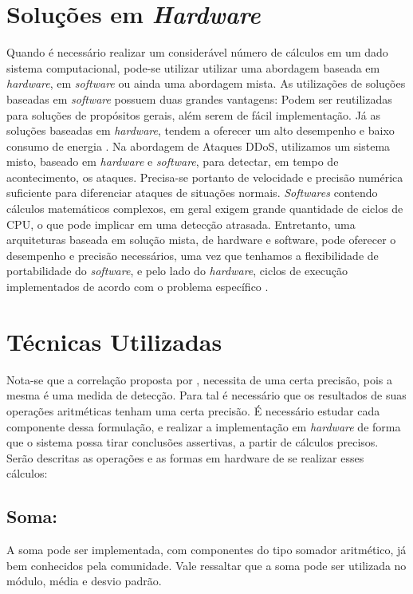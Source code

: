 \section{Soluções em \textit{Hardware}}

Quando é necessário realizar um considerável número de cálculos em um dado sistema computacional, pode-se utilizar utilizar uma abordagem baseada em \textit{hardware}, em \textit{software} ou ainda uma abordagem mista. As utilizações de soluções baseadas em \textit{software} possuem duas grandes vantagens: Podem ser reutilizadas para soluções de propósitos gerais, além serem de fácil implementação. Já as soluções baseadas em \textit{hardware}, tendem a oferecer um alto desempenho e baixo consumo de energia \cite{HOQUE201748}.  Na abordagem de Ataques DDoS, utilizamos um sistema misto, baseado em \textit{hardware} e \textit{software}, para detectar, em tempo de acontecimento, os ataques. Precisa-se portanto de velocidade e precisão numérica suficiente para diferenciar ataques de situações normais. \textit{Softwares} contendo cálculos matemáticos complexos, em geral exigem grande quantidade de ciclos de CPU, o que pode implicar em uma detecção atrasada. Entretanto, uma arquiteturas baseada em solução mista, de hardware e software, pode oferecer o desempenho e precisão necessários, uma vez que tenhamos a flexibilidade de portabilidade do \textit{software}, e pelo lado do \textit{hardware}, ciclos de execução implementados de acordo com o problema específico \cite{miranda2002computador} .

\section{Técnicas Utilizadas}
Nota-se que a correlação proposta por \cite{HOQUE201748}, necessita de uma certa precisão, pois a mesma é uma medida de detecção. Para tal é necessário que os resultados de suas operações aritméticas tenham uma certa precisão. É  necessário estudar cada componente dessa formulação, e realizar a implementação em \textit{hardware} de forma que o sistema possa tirar conclusões assertivas, a partir de cálculos precisos. Serão descritas as operações e as formas em hardware de se realizar esses cálculos:

\subsection{Soma:} A soma pode ser implementada, com componentes do tipo somador aritmético, já bem conhecidos pela comunidade. Vale ressaltar que a soma pode ser utilizada no módulo, média e desvio padrão.
